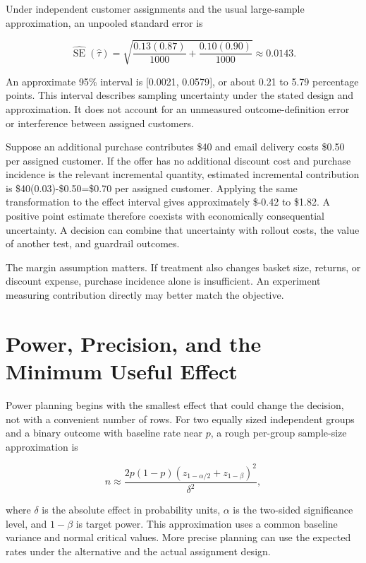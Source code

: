 Under independent customer assignments and the usual large-sample
approximation, an unpooled standard error is

\[
\widehat{\operatorname{SE}}(\hat\tau)
=\sqrt{\frac{0.13(0.87)}{1000}+\frac{0.10(0.90)}{1000}}
\approx0.0143.
\]

An approximate 95\% interval is {[}0.0021, 0.0579{]}, or about 0.21 to
5.79 percentage points. This interval describes sampling uncertainty
under the stated design and approximation. It does not account for an
unmeasured outcome-definition error or interference between assigned
customers.

Suppose an additional purchase contributes \$40 and email delivery costs
\$0.50 per assigned customer. If the offer has no additional discount
cost and purchase incidence is the relevant incremental quantity,
estimated incremental contribution is \$40(0.03)-\$0.50=\$0.70 per
assigned customer. Applying the same transformation to the effect
interval gives approximately \$-0.42 to \$1.82. A positive point
estimate therefore coexists with economically consequential uncertainty.
A decision can combine that uncertainty with rollout costs, the value of
another test, and guardrail outcomes.

The margin assumption matters. If treatment also changes basket size,
returns, or discount expense, purchase incidence alone is insufficient.
An experiment measuring contribution directly may better match the
objective.

\hypertarget{M06-power-precision-and-the-minimum-useful-effect}{%
\section{Power, Precision, and the Minimum Useful
Effect}\label{M06-power-precision-and-the-minimum-useful-effect}}

\noindent Power planning begins with the smallest effect that could change the
decision, not with a convenient number of rows. For two equally sized
independent groups and a binary outcome with baseline rate near \(p\), a
rough per-group sample-size approximation is

\[
n\approx\frac{2p(1-p)(z_{1-\alpha/2}+z_{1-\beta})^2}{\delta^2},
\]

where \(\delta\) is the absolute effect in probability units, \(\alpha\)
is the two-sided significance level, and \(1-\beta\) is target power.
This approximation uses a common baseline variance and normal critical
values. More precise planning can use the expected rates under the
alternative and the actual assignment design.

